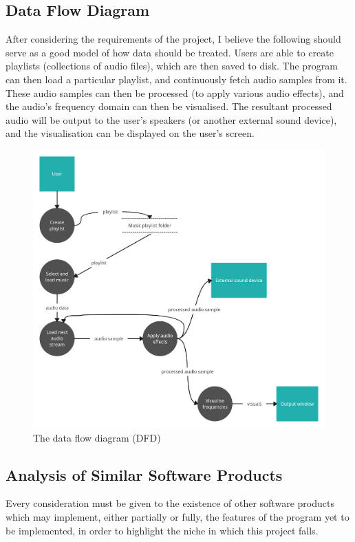 \pagebreak
\subsection{Data Flow Diagram}
After considering the requirements of the project, I believe the following should serve as a good model of how data should be treated. Users are able to create playlists (collections of audio files), which are then saved to disk. The program can then load a particular playlist, and continuously fetch audio samples from it. These audio samples can then be processed (to apply various audio effects), and the audio's frequency domain can then be visualised. The resultant processed audio will be output to the user's speakers (or another external sound device), and the visualisation can be displayed on the user's screen.

\begin{figure}[h]
	\includegraphics[width=13cm]{./DFD.png}
	\caption{The data flow diagram (DFD)}
\end{figure}

\pagebreak
\subsection{Analysis of Similar Software Products}
Every consideration must be given to the existence of other software products which may implement, either partially or fully, the features of the program yet to be implemented, in order to highlight the niche in which this project falls.


